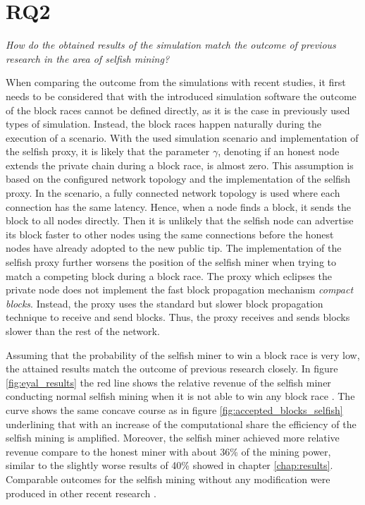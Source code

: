 \section{RQ2}

\textit{How do the obtained results of the simulation match the outcome of previous research in the area of selfish mining?}

When comparing the outcome from the simulations with recent studies, it first needs to be considered that with the introduced simulation software the outcome of the block races cannot be defined directly, as it is the case in previously used types of simulation.
Instead, the block races happen naturally during the execution of a scenario.
With the used simulation scenario and implementation of the selfish proxy, it is likely that the parameter $\gamma$, denoting if an honest node extends the private chain during a block race, is almost zero.
This assumption is based on the configured network topology and the implementation of the selfish proxy.
In the scenario, a fully connected network topology is used where each connection has the same latency.
Hence, when a node finds a block, it sends the block to all nodes directly.
Then it is unlikely that the selfish node can advertise its block faster to other nodes using the same connections before the honest nodes have already adopted to the new public tip.
The implementation of the selfish proxy further worsens the position of the selfish miner when trying to match a competing block during a block race.
The proxy which eclipses the private node does not implement the fast block propagation mechanism \textit{compact blocks}.
Instead, the proxy uses the standard but slower block propagation technique to receive and send blocks.
Thus, the proxy receives and sends blocks slower than the rest of the network.

Assuming that the probability of the selfish miner to win a block race is very low, the attained results match the outcome of previous research closely.
In figure \ref{fig:eyal_results} the red line shows the relative revenue of the selfish miner conducting normal selfish mining when it is not able to win any block race \cite{eyal2014majority}.
The curve shows the same concave course as in figure \ref{fig:accepted_blocks_selfish} underlining that with an increase of the computational share the efficiency of the selfish mining is amplified.
Moreover, the selfish miner achieved more relative revenue compare to the honest miner with about 36\% of the mining power, similar to the slightly worse results of 40\% showed in chapter \ref{chap:results}.
Comparable outcomes for the selfish mining without any modification were produced in other recent research \cite{nayak2016stubborn, sapirshtein2016optimal}.

